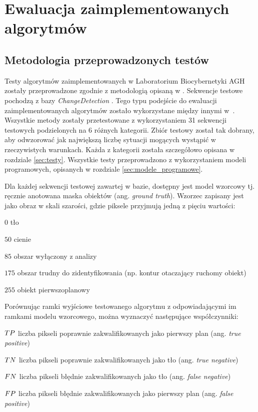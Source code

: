 \chapter{Ewaluacja zaimplementowanych algorytmów}
\label{cha:ewaluacja}

\section{Metodologia przeprowadzonych testów}
\label{sec:metodologia_testow}

Testy algorytmów zaimplementowanych w Laboratorium Biocybernetyki AGH zostały przeprowadzone zgodnie z metodologią opisaną w \cite{changedetection_15}. 
Sekwencje testowe pochodzą z bazy \textit{ChangeDetection} \cite{change_detection_web}. 
Tego typu podejście do ewaluacji zaimplementowanych algorytmów zostało wykorzystane między innymi w~\cite{kryjak_14_vibe, kryjak_14_pbas, janus_15}. 
Wszystkie metody zostały przetestowane z wykorzystaniem 31 sekwencji testowych podzielonych na 6 różnych kategorii. 
Zbiór testowy został tak dobrany, aby odwzorować jak największą liczbę sytuacji mogących wystąpić w rzeczywistych warunkach. %
Każda z kategorii została szczegółowo opisana w rozdziale \ref{sec:testy}. Wszystkie testy przeprowadzono z wykorzystaniem modeli programowych, opisanych w rozdziale \ref{sec:modele_programowe}.

Dla każdej sekwencji testowej zawartej w bazie, dostępny jest model wzorcowy tj. ręcznie anotowana maska obiektów (ang. \textit{ground truth}).
Wzorzec zapisany jest jako obraz w skali szarości, gdzie piksele przyjmują jedną z pięciu wartości:

\begin{eqwhere}[2cm]
	\item[$0$] tło
	\item[$50$] cienie
	\item[$85$] obszar wyłączony z analizy
	\item [$175$] obszar trudny do zidentyfikowania (np. kontur otaczający ruchomy obiekt)
	\item [$255$] obiekt pierwszoplanowy \\
\end{eqwhere}  

\noindent Porównując ramki wyjściowe testowanego algorytmu z odpowiadającymi im ramkami modelu wzorcowego, można wyznaczyć następujące współczynniki:
\begin{eqwhere}[2cm]
	\item[$\small TP$] liczba pikseli poprawnie zakwalifikowanych jako pierwszy plan (ang. \textit{true positive})
	\item[$\small TN$] liczba pikseli poprawnie zakwalifikowanych jako tło (ang. \textit{true negative})
	\item[$\small FN$] liczba pikseli błędnie zakwalifikowanych jako tło (ang. \textit{false negative})
	\item[$\small FP$] liczba pikseli błędnie zakwalifikowanych jako pierwszy plan (ang. \textit{false positive})\\
\end{eqwhere}

